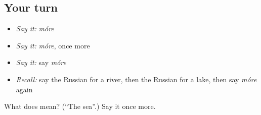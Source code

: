 \subsection*{Your turn}
\begin{itemize}
\raggedright
  \item \emph{Say it:} \emph{móre}
  \item \emph{Say it:} \emph{móre}, once more
  \item \emph{Say it:} say \emph{móre}
  \item \emph{Recall:} say the Russian for a river, then the Russian for a lake, then say \emph{móre} again
\end{itemize}

\begin{tcolorbox}[breakable,colback=teal!4,colframe=teal!35!black,title={Before you move on}]
What does  mean? (\textquotedblleft{}The sea\textquotedblright{}.) Say it once more.
\end{tcolorbox}
